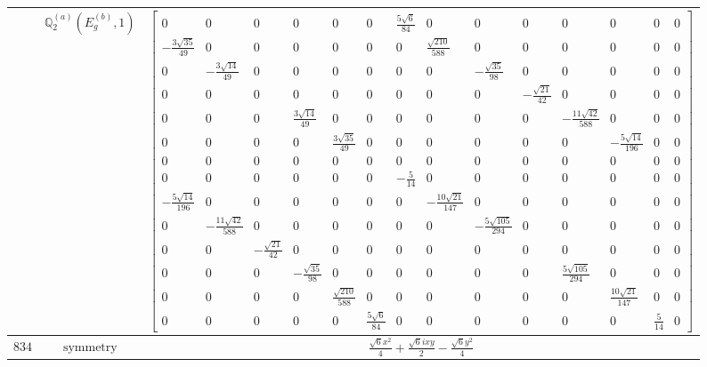 \documentclass[fleqn,8pt,landscape]{jsarticle}
\begin{document}
\begin{longtable}{ccc}
$  $ & $ \mathbb{Q}_{2}^{(a)}(E_{g}^{(b)},1) $ & $ \begin{bmatrix} 0 & 0 & 0 & 0 & 0 & 0 & \frac{5 \sqrt{6}}{84} & 0 & 0 & 0 & 0 & 0 & 0 & 0 \\ - \frac{3 \sqrt{35}}{49} & 0 & 0 & 0 & 0 & 0 & 0 & \frac{\sqrt{210}}{588} & 0 & 0 & 0 & 0 & 0 & 0 \\ 0 & - \frac{3 \sqrt{14}}{49} & 0 & 0 & 0 & 0 & 0 & 0 & - \frac{\sqrt{35}}{98} & 0 & 0 & 0 & 0 & 0 \\ 0 & 0 & 0 & 0 & 0 & 0 & 0 & 0 & 0 & - \frac{\sqrt{21}}{42} & 0 & 0 & 0 & 0 \\ 0 & 0 & 0 & \frac{3 \sqrt{14}}{49} & 0 & 0 & 0 & 0 & 0 & 0 & - \frac{11 \sqrt{42}}{588} & 0 & 0 & 0 \\ 0 & 0 & 0 & 0 & \frac{3 \sqrt{35}}{49} & 0 & 0 & 0 & 0 & 0 & 0 & - \frac{5 \sqrt{14}}{196} & 0 & 0 \\ 0 & 0 & 0 & 0 & 0 & 0 & 0 & 0 & 0 & 0 & 0 & 0 & 0 & 0 \\ 0 & 0 & 0 & 0 & 0 & 0 & - \frac{5}{14} & 0 & 0 & 0 & 0 & 0 & 0 & 0 \\ - \frac{5 \sqrt{14}}{196} & 0 & 0 & 0 & 0 & 0 & 0 & - \frac{10 \sqrt{21}}{147} & 0 & 0 & 0 & 0 & 0 & 0 \\ 0 & - \frac{11 \sqrt{42}}{588} & 0 & 0 & 0 & 0 & 0 & 0 & - \frac{5 \sqrt{105}}{294} & 0 & 0 & 0 & 0 & 0 \\ 0 & 0 & - \frac{\sqrt{21}}{42} & 0 & 0 & 0 & 0 & 0 & 0 & 0 & 0 & 0 & 0 & 0 \\ 0 & 0 & 0 & - \frac{\sqrt{35}}{98} & 0 & 0 & 0 & 0 & 0 & 0 & \frac{5 \sqrt{105}}{294} & 0 & 0 & 0 \\ 0 & 0 & 0 & 0 & \frac{\sqrt{210}}{588} & 0 & 0 & 0 & 0 & 0 & 0 & \frac{10 \sqrt{21}}{147} & 0 & 0 \\ 0 & 0 & 0 & 0 & 0 & \frac{5 \sqrt{6}}{84} & 0 & 0 & 0 & 0 & 0 & 0 & \frac{5}{14} & 0 \end{bmatrix} $ \\ \hline
$ 834 $ & $ \text{symmetry} $ & $ \frac{\sqrt{6} x^{2}}{4} + \frac{\sqrt{6} i x y}{2} - \frac{\sqrt{6} y^{2}}{4} $ \\

\end{longtable}
\end{document}
